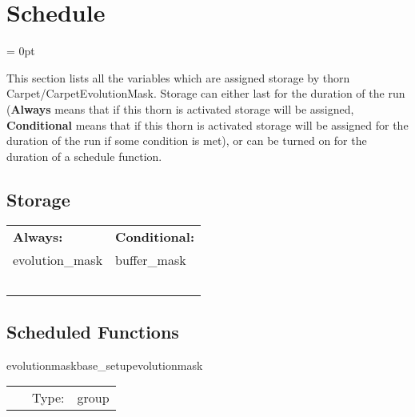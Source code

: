 
\section{Schedule} 


\parskip = 0pt


\noindent This section lists all the variables which are assigned storage by thorn Carpet/CarpetEvolutionMask.  Storage can either last for the duration of the run ({\bf Always} means that if this thorn is activated storage will be assigned, {\bf Conditional} means that if this thorn is activated storage will be assigned for the duration of the run if some condition is met), or can be turned on for the duration of a schedule function.


\subsection*{Storage}

\hspace{5mm}

 \begin{tabular*}{160mm}{ll} 

{\bf Always:}& {\bf Conditional:} \\ 
 evolution\_mask &  buffer\_mask\\ 
~ & ~\\ 
\end{tabular*} 


\subsection*{Scheduled Functions}
\vspace{5mm}


\hspace{5mm} evolutionmaskbase\_setupevolutionmask 

\hspace{5mm}{\it set up the mask function } 


\hspace{5mm}

 \begin{tabular*}{160mm}{cll} 
~ & Type:  & group \\ 
\end{tabular*} 


\vspace{5mm}


